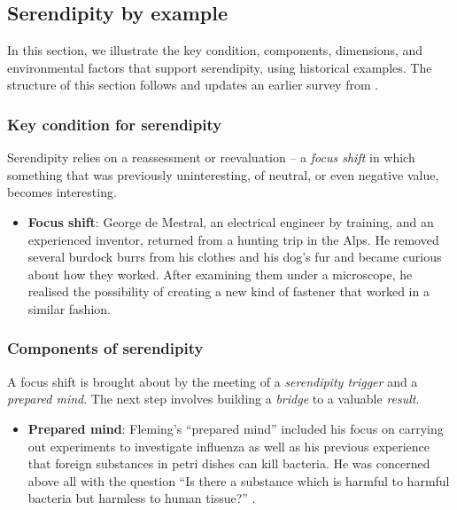 \subsection{Serendipity by example} \label{sec:by-example}

In this section, we illustrate the key condition, components,
dimensions, and environmental factors that support serendipity, using
historical examples.  The structure of this section follows and
updates an earlier survey from .

\subsubsection*{Key condition for serendipity}

Serendipity relies on a reassessment or reevaluation -- a \emph{focus shift} in which something that was previously uninteresting, of neutral, or even negative value, becomes interesting.

\begin{itemize}
\item \textbf{Focus shift}: George de Mestral, an electrical engineer
  by training, and an experienced inventor, returned from a hunting
  trip in the Alps.  He removed several burdock burrs from his clothes
  and his dog's fur and became curious about how they worked. After
  examining them under a microscope, he realised the possibility of
  creating a new kind of fastener that worked in a similar
  fashion.~\cite[p. x]{roberts}
\end{itemize}

\subsubsection*{Components of serendipity}

A focus shift is brought about by the meeting of a \emph{serendipity trigger} and a \emph{prepared mind}.  The next step involves building a \emph{bridge} to a valuable \emph{result}.

\begin{itemize}
\item \textbf{Prepared mind}: 
Fleming's ``prepared mind'' included his focus
on carrying out experiments to investigate influenza as well as his
previous experience that foreign substances in petri dishes can kill
bacteria.  He was concerned above all with the question ``Is there a
substance which is harmful to harmful bacteria but harmless to human
tissue?''  \cite[p. 161]{roberts}.
\end{itemize}

